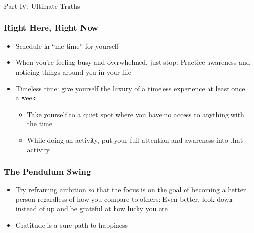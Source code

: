 \begin{frame}[fragile]\frametitle{}
\begin{center}
{\Large Part IV: Ultimate Truths}
\end{center}
\end{frame}

\begin{frame}[fragile]\frametitle{Right Here, Right Now}
\begin{itemize}
\item Schedule in “me-time” for yourself
\item When you’re feeling busy and overwhelmed, just stop: Practice awareness and noticing things around you in your life
\item Timeless time: give yourself the luxury of a timeless experience at least once a week
	\begin{itemize}
	\item Take yourself to a quiet spot where you have no access to anything with the time
	\item While doing an activity, put your full attention and awareness into that activity
	\end{itemize}
\end{itemize}

\end{frame}

\begin{frame}[fragile]\frametitle{The Pendulum Swing}
\begin{itemize}
\item Try reframing ambition so that the focus is on the goal of becoming a better person regardless of how you compare to others: Even better, look down instead of up and be grateful at how lucky you are
\item Gratitude is a sure path to happiness
\end{itemize}

\end{frame}

